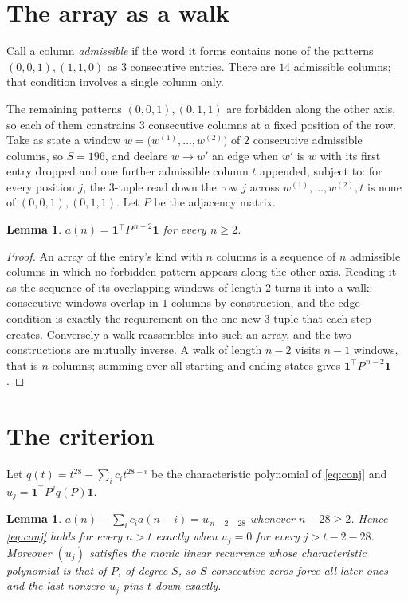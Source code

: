 \documentclass[11pt,a4paper]{article}
\theoremstyle{plain}
\newtheorem{lemma}[theorem]{Lemma}
\theoremstyle{definition}
\begin{document}
\section{The array as a walk}

Call a column \emph{admissible} if the word it forms contains none of the patterns
$(0,0,1), (1,1,0)$ as $3$ consecutive entries. There are $14$ admissible columns; that condition
involves a single column only.

The remaining patterns $(0,0,1), (0,1,1)$ are forbidden along the other axis, so each of them
constrains $3$ consecutive columns at a fixed position of the row. Take as state a
window $w=\bigl(w^{(1)},\dots,w^{(2)}\bigr)$ of $2$ consecutive admissible
columns, so $S=196$, and declare $w\to w'$ an edge when $w'$ is $w$ with its first entry
dropped and one further admissible column $t$ appended, subject to: for every position
$j$, the $3$-tuple read down the row $j$ across $w^{(1)},\dots,w^{(2)},t$
is none of $(0,0,1), (0,1,1)$. Let $P$ be the adjacency matrix.

\begin{lemma}\label{lem:walk}
$a(n)=\mathbf{1}^{\!\top}P^{\,n-2}\mathbf{1}$ for every $n\ge2$.
\end{lemma}

\begin{proof}
An array of the entry's kind with $n$ columns is a sequence of $n$ admissible columns in
which no forbidden pattern appears along the other axis. Reading it as the sequence of its
overlapping windows of length $2$ turns it into a walk: consecutive windows overlap in
$1$ columns by construction, and the edge condition is exactly the requirement on the one
new $3$-tuple that each step creates. Conversely a walk reassembles into such an array,
and the two constructions are mutually inverse. A walk of length $n-2$ visits $n-1$
windows, that is $n$ columns; summing over all starting and ending states gives
$\mathbf{1}^{\!\top}P^{\,n-2}\mathbf{1}$.
\end{proof}

\section{The criterion}

Let $q(t)=t^{28}-\sum_i c_i t^{28-i}$ be the characteristic polynomial of
\eqref{eq:conj} and $u_j=\mathbf{1}^{\!\top}P^{j}q(P)\mathbf{1}$.

\begin{lemma}\label{lem:crit}
$a(n)-\sum_i c_i a(n-i)=u_{\,n-2-28}$ whenever $n-28\ge2$. Hence
\eqref{eq:conj} holds for every $n>t$ exactly when $u_j=0$ for every
$j>t-2-28$. Moreover $(u_j)$ satisfies the monic linear recurrence whose
characteristic polynomial is that of $P$, of degree $S$, so $S$ consecutive zeros force all
later ones and the last nonzero $u_j$ pins $t$ down exactly.
\end{lemma}
\end{document}
